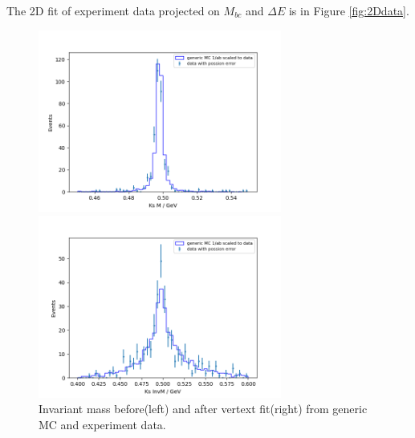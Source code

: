 The 2D fit of experiment data projected on $M_{bc}$ and $\Delta E$ is in Figure \ref{fig:2Ddata}.  
\begin{figure}[htbp]
\begin{minipage}[b]{0.5\linewidth}
	\centering 
	\includegraphics[height=6cm]{figures/best_KsM}	
\end{minipage}
\begin{minipage}[b]{0.5\linewidth}
	\centering 
	\includegraphics[height=6cm]{figures/best_KsInvM}	
\end{minipage}
\caption{Invariant mass before(left) and after vertext fit(right) from generic MC and experiment data.}
\label{fig:b0ksmass}
\end{figure}

